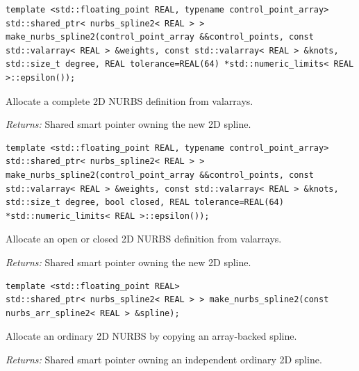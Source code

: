 \par\noindent\begin{minipage}{\linewidth}
\begin{lstlisting}[style=apireference]
template <std::floating_point REAL, typename control_point_array>
std::shared_ptr< nurbs_spline2< REAL > > make_nurbs_spline2(control_point_array &&control_points, const std::valarray< REAL > &weights, const std::valarray< REAL > &knots, std::size_t degree, REAL tolerance=REAL(64) *std::numeric_limits< REAL >::epsilon());
\end{lstlisting}
{\footnotesize Allocate a complete 2D NURBS definition from valarrays.\par}
{\footnotesize\textit{Returns:} Shared smart pointer owning the new 2D spline.\par}
\end{minipage}\par\vspace{1pt}
\par\noindent\begin{minipage}{\linewidth}
\begin{lstlisting}[style=apireference]
template <std::floating_point REAL, typename control_point_array>
std::shared_ptr< nurbs_spline2< REAL > > make_nurbs_spline2(control_point_array &&control_points, const std::valarray< REAL > &weights, const std::valarray< REAL > &knots, std::size_t degree, bool closed, REAL tolerance=REAL(64) *std::numeric_limits< REAL >::epsilon());
\end{lstlisting}
{\footnotesize Allocate an open or closed 2D NURBS definition from valarrays.\par}
{\footnotesize\textit{Returns:} Shared smart pointer owning the new 2D spline.\par}
\end{minipage}\par\vspace{1pt}
\par\noindent\begin{minipage}{\linewidth}
\begin{lstlisting}[style=apireference]
template <std::floating_point REAL>
std::shared_ptr< nurbs_spline2< REAL > > make_nurbs_spline2(const nurbs_arr_spline2< REAL > &spline);
\end{lstlisting}
{\footnotesize Allocate an ordinary 2D NURBS by copying an array-backed spline.\par}
{\footnotesize\textit{Returns:} Shared smart pointer owning an independent ordinary 2D spline.\par}
\end{minipage}\par\vspace{1pt}

